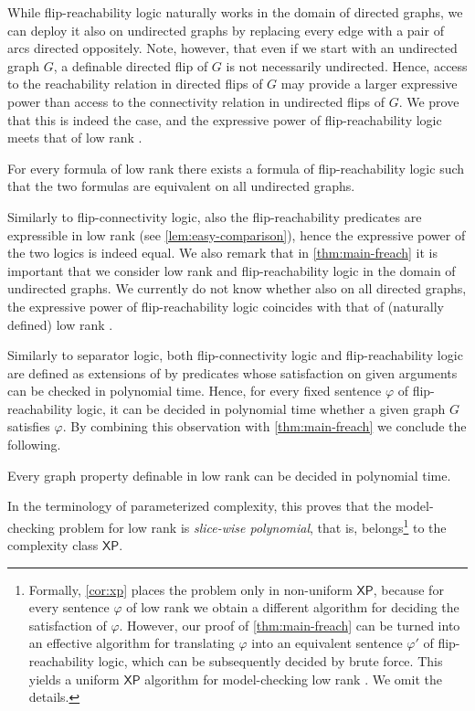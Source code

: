 While flip-reachability logic naturally works in the domain of directed graphs, we can deploy it also on undirected graphs by replacing every edge with a pair of arcs directed oppositely. Note, however, that even if we start with an undirected graph $G$, a definable directed flip of $G$ is not necessarily undirected. Hence, access to the reachability relation in directed flips of $G$ may provide a larger expressive power than access to the connectivity relation in undirected flips of $G$. We prove that this is indeed the case, and the expressive power of flip-reachability logic meets that of low rank \mso.

\begin{theorem}\label{thm:main-freach}
For every formula of low rank \mso there exists a formula of flip-reachability logic such that the two formulas are equivalent on all undirected graphs.
\end{theorem}

Similarly to flip-connectivity logic, also the flip-reachability predicates are expressible in low rank \mso (see \cref{lem:easy-comparison}), hence the expressive power of the two logics is indeed equal. We also remark that in \cref{thm:main-freach} it is important that we consider low rank \mso and flip-reachability logic in the domain of undirected graphs. We currently do not know whether also on all directed graphs, the expressive power of flip-reachability logic coincides with that of (naturally defined) low rank \mso.

Similarly to separator logic, both flip-connectivity logic and flip-reachability logic are defined as extensions of \fo by predicates whose satisfaction on given arguments can be checked in polynomial time. Hence, for every fixed sentence $\varphi$ of flip-reachability logic, it can be decided in polynomial time whether a given graph $G$ satisfies $\varphi$. By combining this observation with \cref{thm:main-freach} we conclude the following.

\begin{corollary}\label{cor:xp}
 Every graph property definable in low rank \mso can be decided in polynomial time.
\end{corollary}

In the terminology of parameterized complexity, this proves that the model-checking problem for low rank \mso is {\em{slice-wise polynomial}}, that is, belongs\footnote{Formally, \cref{cor:xp} places the problem only in non-uniform $\mathsf{XP}$, because for every sentence $\varphi$ of low rank \mso we obtain a different algorithm for deciding the satisfaction of $\varphi$. However, our proof of \cref{thm:main-freach} can be turned into an effective algorithm for translating $\varphi$ into an equivalent sentence $\varphi'$ of flip-reachability logic, which can be subsequently decided by brute force. This yields a uniform $\mathsf{XP}$ algorithm for model-checking low rank \mso. We omit the details.} to the complexity class $\mathsf{XP}$.

